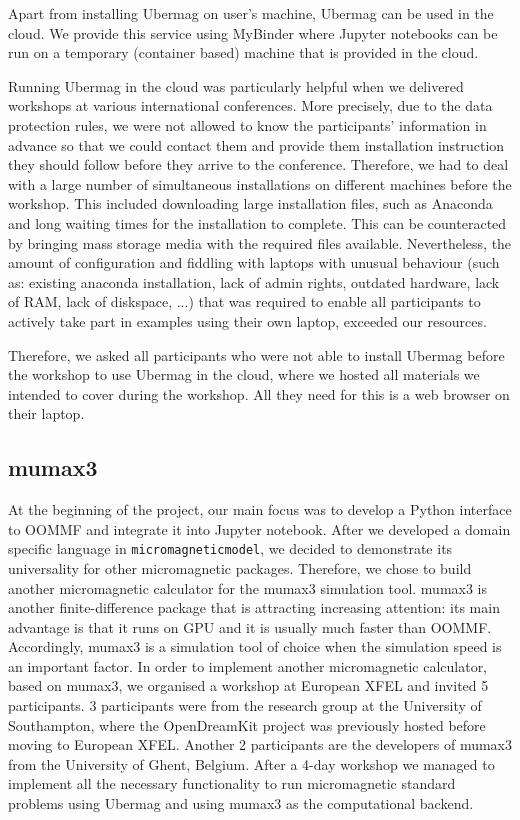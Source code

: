 \documentclass{deliverablereport}
\begin{document}
Apart from installing Ubermag on user's machine, Ubermag can be used
in the cloud. We provide this service using MyBinder where Jupyter
notebooks can be run on a temporary (container based) machine that is
provided in the cloud.

Running Ubermag in the cloud was particularly helpful when we
delivered workshops at various international conferences. More
precisely, due to the data protection rules, we were not allowed to
know the participants' information in advance so that we could contact
them and provide them installation instruction they should follow
before they arrive to the conference. Therefore, we had to deal with a
large number of simultaneous installations on different machines
before the workshop. This included downloading large installation
files, such as Anaconda and long waiting times for the installation to
complete. This can be counteracted by bringing mass storage media with
the required files available. Nevertheless, the amount of
configuration and fiddling with laptops with unusual behaviour (such
as: existing anaconda installation, lack of admin rights, outdated
hardware, lack of RAM, lack of diskspace, ...) that was required to
enable all participants to actively take part in examples using their
own laptop, exceeded our resources.

Therefore, we asked all participants who were not able to
install Ubermag before the workshop to use Ubermag in the cloud, where
we hosted all materials we intended to cover during the workshop. All
they need for this is a web browser on their laptop.

\subsection{mumax3}

At the beginning of the project, our main focus was to develop a
Python interface to OOMMF and integrate it into Jupyter
notebook. After we developed a domain specific language in
\texttt{micromagneticmodel}, we decided to demonstrate its
universality for other micromagnetic packages. Therefore, we chose to
build another micromagnetic calculator for the mumax3 simulation
tool. mumax3 is another finite-difference package that is attracting
increasing attention: its main advantage is that it runs on GPU and it
is usually much faster than OOMMF. Accordingly, mumax3 is a simulation
tool of choice when the simulation speed is an important factor. In
order to implement another micromagnetic calculator, based on mumax3,
we organised a workshop at European XFEL and invited 5 participants. 3
participants were from the research group at the University of
Southampton, where the OpenDreamKit project was previously hosted
before moving to European XFEL. Another 2 participants are the
developers of mumax3 from the University of Ghent, Belgium. After a
4-day workshop we managed to implement all the necessary functionality
to run micromagnetic standard problems using Ubermag and using mumax3
as the computational backend.
\end{document}
